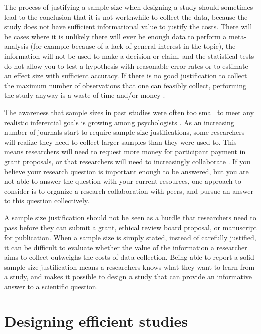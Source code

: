 \documentclass[
]{krantz}
\begin{document}
The process of justifying a sample size when designing a study should sometimes lead to the conclusion that it is not worthwhile to collect the data, because the study does not have sufficient informational value to justify the costs. There will be cases where it is unlikely there will ever be enough data to perform a meta-analysis (for example because of a lack of general interest in the topic), the information will not be used to make a decision or claim, and the statistical tests do not allow you to test a hypothesis with reasonable error rates or to estimate an effect size with sufficient accuracy. If there is no good justification to collect the maximum number of observations that one can feasibly collect, performing the study anyway is a waste of time and/or money \citep{button_power_2013, brown_errors_1983, halpern_continuing_2002}.

The awareness that sample sizes in past studies were often too small to meet any realistic inferential goals is growing among psychologists \citep{lindsay_replication_2015, sedlmeier_studies_1989, fraley_n-pact_2014, button_power_2013}. As an increasing number of journals start to require sample size justifications, some researchers will realize they need to collect larger samples than they were used to. This means researchers will need to request more money for participant payment in grant proposals, or that researchers will need to increasingly collaborate \citep{moshontz_psychological_2018}. If you believe your research question is important enough to be answered, but you are not able to answer the question with your current resources, one approach to consider is to organize a research collaboration with peers, and pursue an answer to this question collectively.

A sample size justification should not be seen as a hurdle that researchers need to pass before they can submit a grant, ethical review board proposal, or manuscript for publication. When a sample size is simply stated, instead of carefully justified, it can be difficult to evaluate whether the value of the information a researcher aims to collect outweighs the costs of data collection. Being able to report a solid sample size justification means a researchers knows what they want to learn from a study, and makes it possible to design a study that can provide an informative answer to a scientific question.

\hypertarget{designing-efficient-studies}{%
\section{Designing efficient studies}\label{designing-efficient-studies}}
\end{document}
